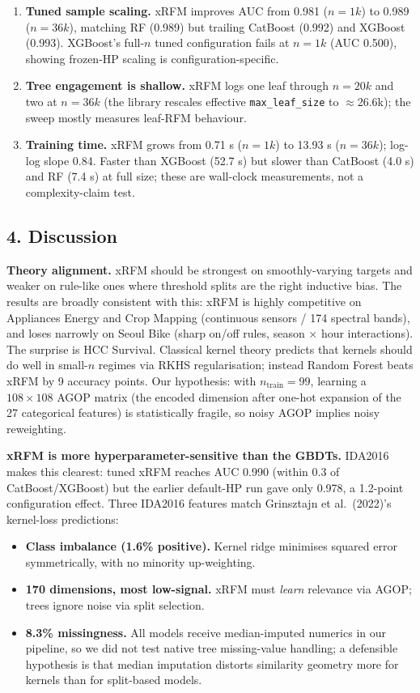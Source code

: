 \documentclass[
  11pt,
  onecolumn]{article}
\providecommand{\tightlist}{%
  \setlength{\itemsep}{0pt}\setlength{\parskip}{0pt}}
\begin{document}
\begin{enumerate}
\def\labelenumi{\arabic{enumi}.}
\tightlist
\item
  \textbf{Tuned sample scaling.} xRFM improves AUC from 0.981 (\(n=1k\))
  to 0.989 (\(n=36k\)), matching RF (0.989) but trailing CatBoost
  (0.992) and XGBoost (0.993). XGBoost's full-\(n\) tuned configuration
  fails at \(n=1k\) (AUC 0.500), showing frozen-HP scaling is
  configuration-specific.
\item
  \textbf{Tree engagement is shallow.} xRFM logs one leaf through
  \(n=20k\) and two at \(n=36k\) (the library rescales effective
  \texttt{max\_leaf\_size} to \(\approx\)26.6k); the sweep mostly
  measures leaf-RFM behaviour.
\item
  \textbf{Training time.} xRFM grows from 0.71 s (\(n=1k\)) to 13.93 s
  (\(n=36k\)); log-log slope 0.84. Faster than XGBoost (52.7 s) but
  slower than CatBoost (4.0 s) and RF (7.4 s) at full size; these are wall-clock
  measurements, not a complexity-claim test.
\end{enumerate}

\subsection{4. Discussion}\label{discussion}

\textbf{Theory alignment.} xRFM should be strongest on smoothly-varying
targets and weaker on rule-like ones where threshold splits are the
right inductive bias. The results are broadly consistent with this:
xRFM is highly competitive on Appliances Energy and Crop Mapping
(continuous sensors / 174 spectral bands), and loses narrowly on Seoul
Bike (sharp on/off rules, season × hour interactions). The surprise is
HCC Survival. Classical kernel theory predicts that kernels should do
well in small-\(n\) regimes via RKHS regularisation; instead Random
Forest beats xRFM by 9 accuracy points. Our hypothesis: with
\(n_\text{train}=99\), learning a \(108 \times 108\) AGOP matrix (the
encoded dimension after one-hot expansion of the 27 categorical
features) is statistically fragile, so noisy AGOP implies noisy
reweighting.

\textbf{xRFM is more hyperparameter-sensitive than the GBDTs.} IDA2016
makes this clearest: tuned xRFM reaches AUC 0.990 (within 0.3 of
CatBoost/XGBoost) but the earlier default-HP run gave only 0.978, a
1.2-point configuration effect. Three IDA2016 features match Grinsztajn et al.~(2022)'s kernel-loss predictions:
\begin{itemize}
\tightlist
\item
  \textbf{Class imbalance (1.6\% positive).} Kernel ridge minimises
  squared error symmetrically, with no minority up-weighting.
\item
  \textbf{170 dimensions, most low-signal.} xRFM must \emph{learn}
  relevance via AGOP; trees ignore noise via split selection.
\item
  \textbf{8.3\% missingness.} All models receive median-imputed numerics
  in our pipeline, so we did not test native tree missing-value
  handling; a defensible hypothesis is that median imputation distorts
  similarity geometry more for kernels than for split-based models.
\end{itemize}
\end{document}
